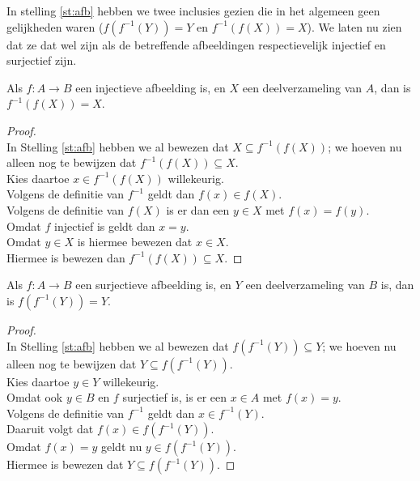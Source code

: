 In stelling \ref{st:afb} hebben we twee inclusies gezien die in het algemeen geen gelijkheden waren ($f(f^{-1}(Y))=Y$ en $f^{-1}(f(X))=X$). We laten nu zien dat ze dat wel zijn als de betreffende afbeeldingen respectievelijk injectief en surjectief zijn.
\begin{theorem}\label{th:injectief}
Als $f:A\rightarrow B$ een injectieve afbeelding is, en $X$ een deelverzameling van $A$, dan is $f^{-1}(f(X))=X$.
\end{theorem}
\begin{proof}\mbox{}\\
In Stelling \ref{st:afb} hebben we al bewezen dat $X\subseteq f^{-1}(f(X))$; we hoeven nu alleen nog te bewijzen dat $f^{-1}(f(X))\subseteq X$.\\[1.5pt]
Kies daartoe $x\in f^{-1}(f(X))$ willekeurig.\\[1.5pt]
Volgens de definitie van $f^{-1}$ geldt dan $f(x)\in f(X)$.\\[1.5pt]
Volgens de definitie van $f(X)$ is er dan een $y\in X$ met $f(x)=f(y)$.\\[1.5pt]
Omdat $f$ injectief is geldt dan $x=y$.\\[1.5pt]
Omdat $y\in X$ is hiermee bewezen dat $x\in X$.\\[1.5pt]
Hiermee is bewezen dan $f^{-1}(f(X))\subseteq X$.
\end{proof}
\begin{theorem}\label{th:surjectief}
Als $f:A\rightarrow B$ een surjectieve afbeelding is, en $Y$ een deelverzameling van $B$ is, dan is $f(f^{-1}(Y))=Y$.
\end{theorem}
\begin{proof}\mbox{}\\
In Stelling \ref{st:afb} hebben we al bewezen dat $f(f^{-1}(Y))\subseteq Y$; we hoeven nu alleen nog te bewijzen dat $Y\subseteq f(f^{-1}(Y))$.\\[1.5pt]
Kies daartoe $y\in Y$ willekeurig.\\[1.5pt]
Omdat ook $y\in B$ en $f$ surjectief is, is er een $x\in A$ met $f(x)=y$.\\[1.5pt]
Volgens de definitie van $f^{-1}$ geldt dan $x\in f^{-1}(Y)$.\\[1.5pt]
Daaruit volgt dat $f(x)\in f(f^{-1}(Y))$.\\[1.5pt]
Omdat $f(x) = y$ geldt nu $y\in f(f^{-1}(Y))$.\\[1.5pt]
Hiermee is bewezen dat $Y\subseteq f(f^{-1}(Y))$.
\end{proof}

